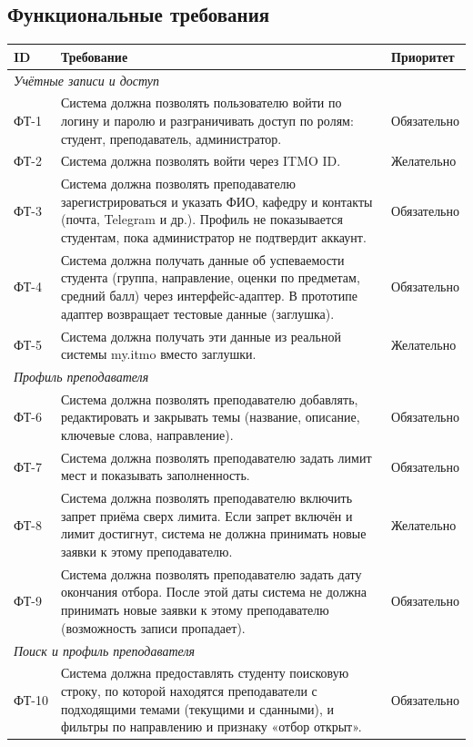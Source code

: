 \documentclass[a4paper,12pt]{article}
\begin{document}
\subsection{Функциональные требования}
{\small
\begin{longtable}{|p{1.3cm}|p{11.1cm}|p{2.3cm}|}
\hline
\textbf{ID} & \textbf{Требование} & \textbf{Приоритет}\\ \hline
\endhead
\multicolumn{3}{|l|}{\textit{Учётные записи и доступ}}\\ \hline
ФТ-1 & Система должна позволять пользователю войти по логину и паролю и разграничивать доступ по ролям: студент, преподаватель, администратор. & Обязательно\\ \hline
ФТ-2 & Система должна позволять войти через ITMO ID. & Желательно\\ \hline
ФТ-3 & Система должна позволять преподавателю зарегистрироваться и указать ФИО, кафедру и контакты (почта, Telegram и др.). Профиль не показывается студентам, пока администратор не подтвердит аккаунт. & Обязательно\\ \hline
ФТ-4 & Система должна получать данные об успеваемости студента (группа, направление, оценки по предметам, средний балл) через интерфейс-адаптер. В прототипе адаптер возвращает тестовые данные (заглушка). & Обязательно\\ \hline
ФТ-5 & Система должна получать эти данные из реальной системы my.itmo вместо заглушки. & Желательно\\ \hline
\multicolumn{3}{|l|}{\textit{Профиль преподавателя}}\\ \hline
ФТ-6 & Система должна позволять преподавателю добавлять, редактировать и закрывать темы (название, описание, ключевые слова, направление). & Обязательно\\ \hline
ФТ-7 & Система должна позволять преподавателю задать лимит мест и показывать заполненность. & Обязательно\\ \hline
ФТ-8 & Система должна позволять преподавателю включить запрет приёма сверх лимита. Если запрет включён и лимит достигнут, система не должна принимать новые заявки к этому преподавателю. & Желательно\\ \hline
ФТ-9 & Система должна позволять преподавателю задать дату окончания отбора. После этой даты система не должна принимать новые заявки к этому преподавателю (возможность записи пропадает). & Обязательно\\ \hline
\multicolumn{3}{|l|}{\textit{Поиск и профиль преподавателя}}\\ \hline
ФТ-10 & Система должна предоставлять студенту поисковую строку, по которой находятся преподаватели с подходящими темами (текущими и сданными), и фильтры по направлению и признаку «отбор открыт». & Обязательно\\ \hline

\end{longtable}}
\end{document}
